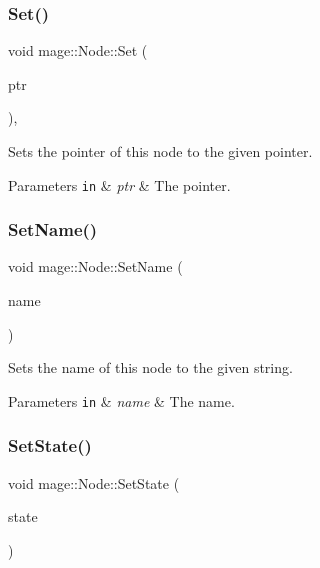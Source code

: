 \subsubsection{\texorpdfstring{Set()}{Set()}}
{\footnotesize\ttfamily void mage\+::\+Node\+::\+Set (\begin{DoxyParamCaption}\item[{\hyperlink{classmage_1_1_node_ac575dc006e0ae1134277ade977dc06b6}{Node\+Ptr}}]{ptr }\end{DoxyParamCaption})\hspace{0.3cm}{\ttfamily [private]}, {\ttfamily [noexcept]}}

Sets the pointer of this node to the given pointer.


\begin{DoxyParams}[1]{Parameters}
\mbox{\tt in}  & {\em ptr} & The pointer. \\
\hline
\end{DoxyParams}
\hypertarget{classmage_1_1_node_a78e4ef8457d200662d2f4881cef08688}{}\label{classmage_1_1_node_a78e4ef8457d200662d2f4881cef08688} 
\subsubsection{\texorpdfstring{Set\+Name()}{SetName()}}
{\footnotesize\ttfamily void mage\+::\+Node\+::\+Set\+Name (\begin{DoxyParamCaption}\item[{string}]{name }\end{DoxyParamCaption})\hspace{0.3cm}{\ttfamily [noexcept]}}

Sets the name of this node to the given string.


\begin{DoxyParams}[1]{Parameters}
\mbox{\tt in}  & {\em name} & The name. \\
\hline
\end{DoxyParams}
\hypertarget{classmage_1_1_node_a9511a52ddcc0bba71a0353338dcd1d9b}{}\label{classmage_1_1_node_a9511a52ddcc0bba71a0353338dcd1d9b} 
\subsubsection{\texorpdfstring{Set\+State()}{SetState()}}
{\footnotesize\ttfamily void mage\+::\+Node\+::\+Set\+State (\begin{DoxyParamCaption}\item[{\hyperlink{namespacemage_a8159a53ed2ac3a0fe7058b2a051fa969}{State}}]{state }\end{DoxyParamCaption})\hspace{0.3cm}{\ttfamily [noexcept]}}

